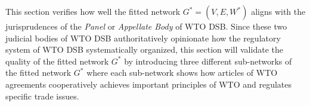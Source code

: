 This section verifies
how well the fitted network $G^* = (V, E, W^*)$
aligns with the jurisprudences of the \textit{Panel} or \textit{Appellate Body} of WTO DSB.
Since these two judicial bodies of WTO DSB authoritatively
opinionate how the regulatory system of WTO DSB systematically organized,
this section will validate the quality of the fitted network $G^*$ by
introducing three different sub-networks of
the fitted network $G^*$ where each sub-network shows how articles of WTO agreements
cooperatively achieves important principles of WTO and regulates specific trade issues.
 
 
 

